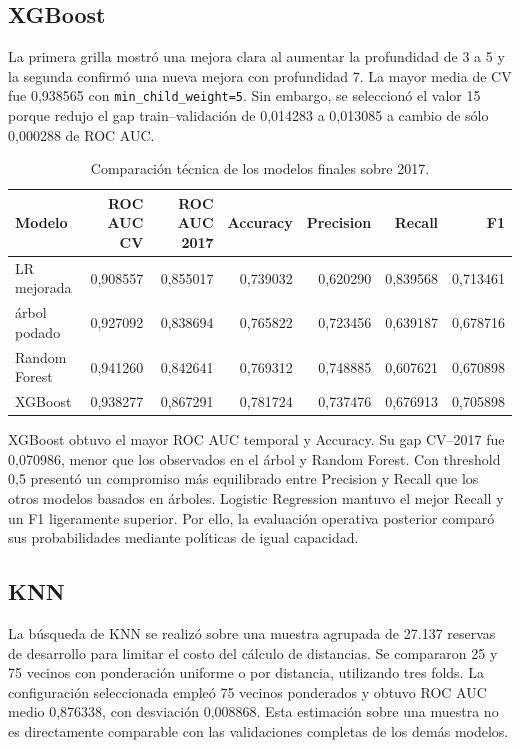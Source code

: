 \subsection{XGBoost}

La primera grilla mostró una mejora clara al aumentar la profundidad de 3 a 5
y la segunda confirmó una nueva mejora con profundidad 7. La mayor media de CV
fue 0,938565 con \texttt{min\_child\_weight=5}. Sin embargo, se seleccionó el
valor 15 porque redujo el gap train--validación de 0,014283 a 0,013085 a cambio
de sólo 0,000288 de ROC AUC.

\begin{table}[htbp]
    \centering
    \caption{Comparación técnica de los modelos finales sobre 2017.}
    \label{tab:xgboost-results}
    \begin{tabular}{lrrrrrr}
        \toprule
        Modelo & ROC AUC CV & ROC AUC 2017 & Accuracy & Precision & Recall & F1 \\
        \midrule
        LR mejorada & 0,908557 & 0,855017 & 0,739032 & 0,620290 & 0,839568 & 0,713461 \\
        árbol podado & 0,927092 & 0,838694 & 0,765822 & 0,723456 & 0,639187 & 0,678716 \\
        Random Forest & 0,941260 & 0,842641 & 0,769312 & 0,748885 & 0,607621 & 0,670898 \\
        XGBoost & 0,938277 & 0,867291 & 0,781724 & 0,737476 & 0,676913 & 0,705898 \\
        \bottomrule
    \end{tabular}
\end{table}

XGBoost obtuvo el mayor ROC AUC temporal y Accuracy. Su gap CV--2017 fue
0,070986, menor que los observados en el árbol y Random Forest. Con threshold
0,5 presentó un compromiso más equilibrado entre Precision y Recall que los
otros modelos basados en árboles. Logistic Regression mantuvo el mejor Recall
y un F1 ligeramente superior. Por ello, la evaluación operativa posterior
comparó sus probabilidades mediante políticas de igual capacidad.

\subsection{KNN}

La búsqueda de KNN se realizó sobre una muestra agrupada de 27.137 reservas de
desarrollo para limitar el costo del cálculo de distancias. Se compararon 25 y
75 vecinos con ponderación uniforme o por distancia, utilizando tres folds. La
configuración seleccionada empleó 75 vecinos ponderados y obtuvo ROC AUC medio
0,876338, con desviación 0,008868. Esta estimación sobre una muestra no es
directamente comparable con las validaciones completas de los demás modelos.

